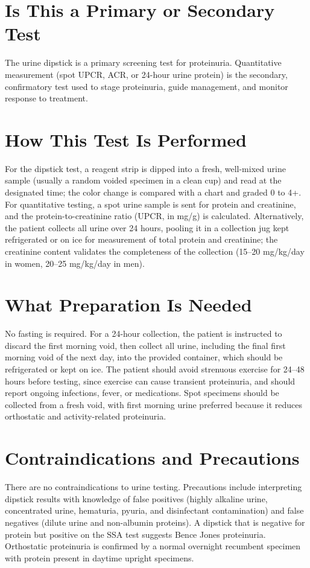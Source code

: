 \section*{Is This a Primary or Secondary Test}
The urine dipstick is a primary screening test for proteinuria. Quantitative measurement (spot UPCR, ACR, or 24-hour urine protein) is the secondary, confirmatory test used to stage proteinuria, guide management, and monitor response to treatment.
\section*{How This Test Is Performed}
For the dipstick test, a reagent strip is dipped into a fresh, well-mixed urine sample (usually a random voided specimen in a clean cup) and read at the designated time; the color change is compared with a chart and graded 0 to 4+. For quantitative testing, a spot urine sample is sent for protein and creatinine, and the protein-to-creatinine ratio (UPCR, in mg/g) is calculated. Alternatively, the patient collects all urine over 24 hours, pooling it in a collection jug kept refrigerated or on ice for measurement of total protein and creatinine; the creatinine content validates the completeness of the collection (15--20 mg/kg/day in women, 20--25 mg/kg/day in men).
\section*{What Preparation Is Needed}
No fasting is required. For a 24-hour collection, the patient is instructed to discard the first morning void, then collect all urine, including the final first morning void of the next day, into the provided container, which should be refrigerated or kept on ice. The patient should avoid strenuous exercise for 24--48 hours before testing, since exercise can cause transient proteinuria, and should report ongoing infections, fever, or medications. Spot specimens should be collected from a fresh void, with first morning urine preferred because it reduces orthostatic and activity-related proteinuria.
\section*{Contraindications and Precautions}
There are no contraindications to urine testing. Precautions include interpreting dipstick results with knowledge of false positives (highly alkaline urine, concentrated urine, hematuria, pyuria, and disinfectant contamination) and false negatives (dilute urine and non-albumin proteins). A dipstick that is negative for protein but positive on the SSA test suggests Bence Jones proteinuria. Orthostatic proteinuria is confirmed by a normal overnight recumbent specimen with protein present in daytime upright specimens.

